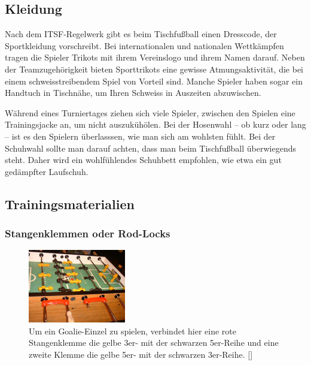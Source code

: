 \subsection{Kleidung}
\label{tisch:zubehoer:kleidung}

Nach dem ITSF-Regelwerk gibt es beim Tischfußball einen Dresscode, der Sportkleidung vorschreibt. 
Bei internationalen und nationalen Wettkämpfen tragen die Spieler Trikots mit ihrem Vereinslogo und ihrem Namen darauf. 
Neben der Teamzugehörigkeit bieten Sporttrikots eine gewisse Atmungsaktivität, die bei einem schweisstreibendem Spiel von Vorteil sind. 
Manche Spieler haben sogar ein Handtuch in Tischnähe, um Ihren Schweiss in Auszeiten abzuwischen.

Während eines Turniertages ziehen sich viele Spieler, zwischen den Spielen eine Trainingsjacke an, um nicht auszukühölen.
Bei der Hosenwahl -- ob kurz oder lang -- ist es den Spielern überlasssen, wie man sich am wohlsten fühlt. 
Bei der Schuhwahl sollte man darauf achten, dass man beim Tischfußball überwiegends steht. 
Daher wird ein wohlfühlendes Schuhbett empfohlen, wie etwa ein gut gedämpfter Laufschuh.  

\subsection{Trainingsmaterialien}
\label{tisch:zubehoer:training}

\subsubsection{Stangenklemmen oder Rod-Locks}
\label{tisch:zubehoer:training:rodlock}

\begin{figure}
\centering 
\includegraphics[width=0.38\textwidth]{img/rodlock_goalie.jpg} 
\caption{Um ein Goalie-Einzel zu spielen, verbindet hier eine rote Stangenklemme die gelbe 3er- mit der schwarzen 5er-Reihe und eine zweite Klemme die gelbe 5er- mit der schwarzen 3er-Reihe. [\cite{www:rod-lock}]} 
\label{fig:rod-lock} 
\end{figure}

